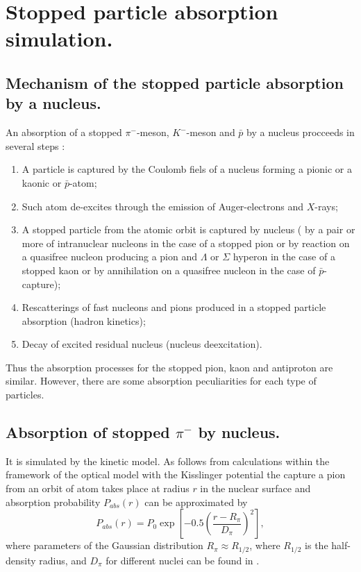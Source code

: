 \section{Stopped particle absorption simulation.}

\subsection{Mechanism of the stopped particle absorption by a nucleus.}
\hspace{1.0em} 
An absorption of a stopped $\pi^{-}$-meson, $K^{-}$-meson and $\bar{p}$
 by a nucleus procceeds in several
 steps \cite{IKP94}:
\begin{enumerate}
\item A particle is captured by the Coulomb fiels of a nucleus forming a pionic
or a kaonic or $\bar{p}$-atom;
\item Such atom de-excites through the emission of Auger-electrons and $X$-rays;
\item A stopped particle from the atomic orbit is captured by nucleus (
 by a pair or more of intranuclear nucleons in the case of a stopped pion or 
 by reaction on a quasifree nucleon producing a pion and $\Lambda$ or
$\Sigma$ hyperon in the case of a stopped kaon or
 by annihilation on a quasifree nucleon in the case of $\bar{p}$-capture);
\item Rescatterings of fast nucleons and pions produced in a stopped 
particle absorption (hadron
kinetics);
\item Decay of excited residual nucleus (nucleus deexcitation).
\end{enumerate}

Thus the absorption processes for the stopped pion, kaon and antiproton are
similar. However, there are some absorption 
peculiarities for each type of particles.
   
\subsection{Absorption of stopped $\pi^{-}$ by nucleus.}
\hspace{1.0em} It is simulated  by the kinetic model.
As follows from calculations within the framework of the optical
model \cite{INC76} with the Kisslinger potential \cite{Kiss55}
 the capture a pion from an orbit of atom takes place at
radius $r$ in the
nuclear surface and absorption probability $P_{abs}(r)$ can be approximated by 
\begin{equation}
\label{SAS1} P_{abs}(r) = P_0 \exp{[-0.5(\frac{r-R_{\pi}}{D_{\pi}})^2]},
\end{equation}
where parameters of the Gaussian distribution $R_{\pi} \approx R_{1/2}$, 
where $R_{1/2}$ is the half-density radius, and $D_{\pi}$
 for different nuclei can be found
in \cite{IKP94}.

